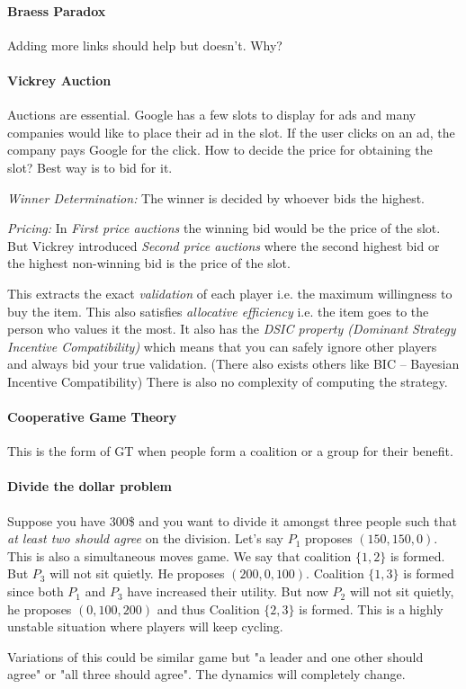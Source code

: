 \paragraph{Braess Paradox} Adding more links should help but doesn't. Why?

\paragraph{Vickrey Auction} Auctions are essential. Google has a few slots to display for ads and many companies would like to place their ad in the slot. If the user clicks on an ad, the company pays Google for the click. How to decide the price for obtaining the slot? Best way is to bid for it.  

\textit{Winner Determination:} The winner is decided by whoever bids the highest.

\textit{Pricing:} In \textit{First price auctions} the winning bid would be the price of the slot. But Vickrey introduced \textit{Second price auctions} where the second highest bid or the highest non-winning bid is the price of the slot.

This extracts the exact \textit{validation} of each player i.e. the maximum willingness to buy the item. This also satisfies \textit{allocative efficiency} i.e. the item goes to the person who values it the most. It also has the \textit{DSIC property (Dominant Strategy Incentive Compatibility)} which means that you can safely ignore other players and always bid your true validation. (There also exists others like BIC -- Bayesian Incentive Compatibility) There is also no complexity of computing the strategy.

\paragraph{Cooperative Game Theory} This is the form of GT when people form a coalition or a group for their benefit.

\paragraph{Divide the dollar problem} Suppose you have 300\$ and you want to divide it amongst three people such that \textit{at least two should agree} on the division. Let's say $P_1$ proposes $(150, 150, 0)$. This is also a simultaneous moves game. We say that coalition $\{1,2\}$ is formed. But $P_3$ will not sit quietly. He proposes $(200, 0, 100)$. Coalition $\{ 1,3\}$ is formed since both $P_1$ and $P_3$ have increased their utility. But now $P_2$ will not sit quietly, he proposes $(0, 100, 200)$ and thus Coalition $\{2, 3\}$ is formed. This is a highly unstable situation where players will keep cycling.

Variations of this could be similar game but "a leader and one other should agree" or "all three should agree". The dynamics will completely change. 
